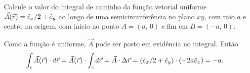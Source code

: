 \begin{examples}
\item \label{ex:a} Calcule o valor do integral de caminho da função vetorial
uniforme $\vec A(\vec r)=\he_x/2+\he_y$ ao longo de uma semicircunferência no
plano $xy$, com raio $a$ e centro na origem, com início no ponto $A=(a,\,0)$ e
fim em $B=(-a,\,0)$.\\
\hfill
\begin{minipage}[t]{0.8\linewidth}
Como a função é uniforme, $\vec A$ pode ser posto em evidência no integral.
Então
\begin{align*}
\int_c\vec A(\vec r)\cdot d\vec r&=\vec A(\vec r)\cdot \int_c d\vec r=\vec
A\cdot\Delta\vec r= (\he_x/2+\he_y)\cdot(-2a\he_x) =-a.
\end{align*}
\end{minipage}


\end{examples}
